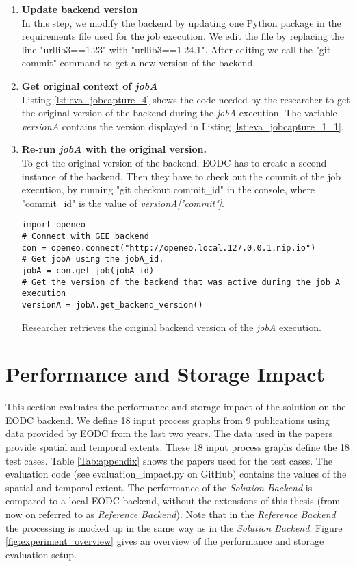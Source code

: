 \documentclass[draft,final]{vutinfth} %
\newenvironment{code}{\captionsetup{type=listing}}{}
\begin{document}
\begin{enumerate}
	\item \textbf{Update backend version} \\
	In this step, we modify the backend by updating one Python package in the requirements file used for the job execution. We edit the file by replacing the line "urllib3==1.23" with "urllib3==1.24.1". After editing we call the "git commit" command to get a new version of the backend. 
	\item \textbf{Get original context of \textit{jobA}} \\
	Listing \ref{lst:eva_jobcapture_4} shows the code needed by the researcher to get the original version of the backend during the \textit{jobA} execution. The variable \textit{versionA} contains the version displayed in Listing \ref{lst:eva_jobcapture_1_1}. 
	\item \textbf{Re-run \textit{jobA} with the original version.} \\
	To get the original version of the backend, EODC has to create a second instance of the backend. Then they have to check out the commit of the job execution, by running "git checkout commit\_id" in the console, where "commit\_id" is the value of \textit{versionA["commit"]}.
	\begin{code}
		\begin{verbatim}
import openeo
# Connect with GEE backend
con = openeo.connect("http://openeo.local.127.0.0.1.nip.io")
# Get jobA using the jobA_id.
jobA = con.get_job(jobA_id)
# Get the version of the backend that was active during the job A execution
versionA = jobA.get_backend_version()
		\end{verbatim}
		\caption{Researcher retrieves the original backend version of the \textit{jobA} execution.}
		\label{lst:eva_jobcapture_4}
	\end{code}	
\end{enumerate}
\newpage
\section{Performance and Storage Impact}\label{Evaluation:impact}

This section evaluates the performance and storage impact of the solution on the EODC backend. We define 18 input process graphs from 9 publications using data provided by EODC from the last two years. The data used in the papers provide spatial and temporal extents. These 18 input process graphs define the 18 test cases. Table \ref{Tab:appendix} shows the papers used for the test cases. The evaluation code (see evaluation\_impact.py on GitHub) contains the values of the spatial and temporal extent. The performance of the \textit{Solution Backend} is compared to a local EODC backend, without the extensions of this thesis (from now on referred to as \textit{Reference Backend}). Note that in the \textit{Reference Backend} the processing is mocked up in the same way as in the \textit{Solution Backend}. Figure \ref{fig:experiment_overview} gives an overview of the performance and storage evaluation setup.  
\end{document}
